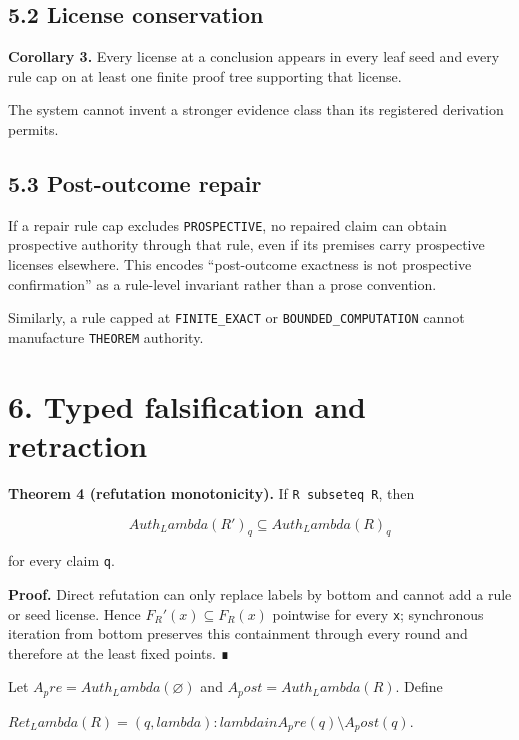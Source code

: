 \documentclass[11pt]{article}
\begin{document}
\hypertarget{license-conservation}{%
\subsection{5.2 License conservation}\label{license-conservation}}

\textbf{Corollary 3.} Every license at a conclusion appears in every
leaf seed and every rule cap on at least one finite proof tree
supporting that license.

The system cannot invent a stronger evidence class than its registered
derivation permits.

\hypertarget{post-outcome-repair}{%
\subsection{5.3 Post-outcome repair}\label{post-outcome-repair}}

If a repair rule cap excludes \texttt{PROSPECTIVE}, no repaired claim
can obtain prospective authority through that rule, even if its premises
carry prospective licenses elsewhere. This encodes ``post-outcome
exactness is not prospective confirmation'' as a rule-level invariant
rather than a prose convention.

Similarly, a rule capped at \texttt{FINITE\_EXACT} or
\texttt{BOUNDED\_COMPUTATION} cannot manufacture \texttt{THEOREM}
authority.

\hypertarget{typed-falsification-and-retraction}{%
\section{6. Typed falsification and
retraction}\label{typed-falsification-and-retraction}}

\textbf{Theorem 4 (refutation monotonicity).} If
\texttt{R\ subseteq\ R\textquotesingle{}}, then

\[Auth_Lambda(R')_q \subseteq Auth_Lambda(R)_q\]

for every claim \texttt{q}.

\textbf{Proof.} Direct refutation can only replace labels by bottom and
cannot add a rule or seed license. Hence \(F_R'(x) \subseteq F_R(x)\)
pointwise for every \texttt{x}; synchronous iteration from bottom
preserves this containment through every round and therefore at the
least fixed points. ∎

Let \(A_pre=Auth_Lambda(\varnothing)\) and \(A_post=Auth_Lambda(R)\).
Define

\(Ret_Lambda(R)={(q,lambda): lambda in A_pre(q)\setminus A_post(q)}\).
\end{document}
